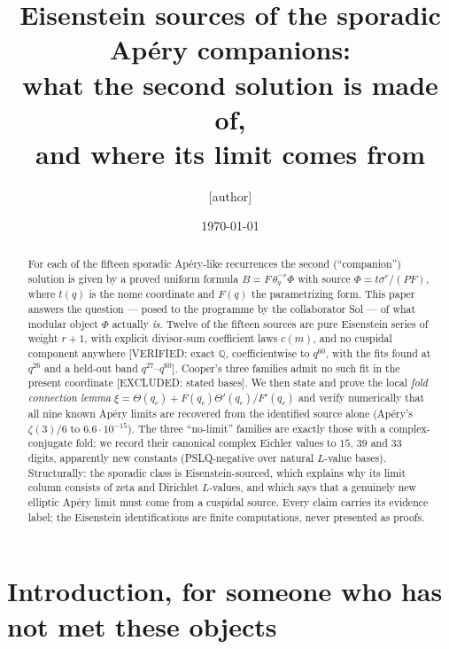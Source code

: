 \documentclass[11pt,reqno]{amsart}
\theoremstyle{plain}
\theoremstyle{definition}
\theoremstyle{remark}
\newcommand{\Q}{\mathbb{Q}}
\newcommand{\thq}{\theta_q}
\newcommand{\VerifiedR}[1]{\textup{\textsf{[VERIFIED: #1]}}}
\newcommand{\ExcludedR}[1]{\textup{\textsf{[EXCLUDED: #1]}}}
\begin{document}
\title[Eisenstein sources of the sporadic companions]
      {Eisenstein sources of the sporadic Ap\'ery companions:\\
       what the second solution is made of,\\
       and where its limit comes from}

\author{[author]}
\date{\today}

\begin{abstract}
For each of the fifteen sporadic Ap\'ery-like recurrences the second
(``companion'') solution is given by a proved uniform formula
$B=F\,\thq^{-r}\Phi$ with source $\Phi=t\sigma^{r}/(P F)$, where $t(q)$ is
the nome coordinate and $F(q)$ the parametrizing form. This paper answers
the question --- posed to the programme by the collaborator Sol --- of what
modular object $\Phi$ actually \emph{is}. Twelve of the fifteen sources are
pure Eisenstein series of weight $r+1$, with explicit divisor-sum
coefficient laws $c(m)$, and no cuspidal component anywhere
\VerifiedR{exact $\Q$, coefficientwise to $q^{60}$, with the fits found at
$q^{26}$ and a held-out band $q^{27}$--$q^{60}$}. Cooper's three families
admit no such fit in the present coordinate \ExcludedR{stated bases}. We
then state and prove the local \emph{fold connection lemma}
$\xi=\Theta(q_c)+F(q_c)\Theta'(q_c)/F'(q_c)$ and verify numerically that
all nine known Ap\'ery limits are recovered from the identified source
alone (Ap\'ery's $\zeta(3)/6$ to $6.6\cdot10^{-15}$). The three
``no-limit'' families are exactly those with a complex-conjugate fold; we
record their canonical complex Eichler values to $15$, $39$ and $33$
digits, apparently new constants (PSLQ-negative over natural $L$-value
bases). Structurally: the sporadic class is Eisenstein-sourced, which
explains why its limit column consists of zeta and Dirichlet $L$-values,
and which says that a genuinely new elliptic Ap\'ery limit must come from a
cuspidal source. Every claim carries its evidence label; the Eisenstein
identifications are finite computations, never presented as proofs.
\end{abstract}

\maketitle

\setcounter{tocdepth}{1}
\tableofcontents

\section{Introduction, for someone who has not met these objects}
\label{sec:intro}
\end{document}
